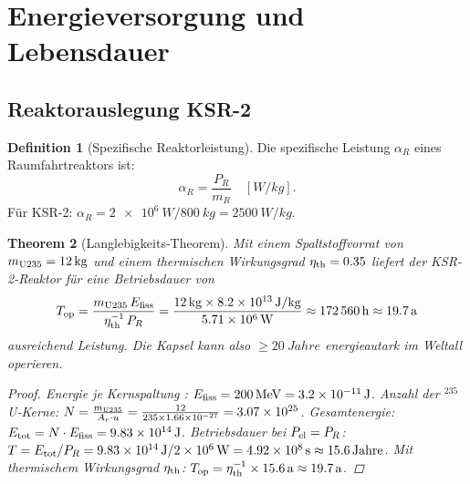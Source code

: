 ﻿\documentclass[a4paper,12pt,twoside]{article}
\theoremstyle{plain}
\newtheorem{theorem}{Theorem}[section]
\theoremstyle{definition}
\newtheorem{definition}[theorem]{Definition}
\theoremstyle{remark}
\begin{document}
	\section{Energieversorgung und Lebensdauer}
	\label{sec:power}
	
	\subsection{Reaktorauslegung KSR-2}
	
	\begin{definition}[Spezifische Reaktorleistung]
		Die spezifische Leistung $\alpha_R$ eines Raumfahrtreaktors ist:
		\begin{equation}
			\alpha_R = \frac{P_R}{m_R} \quad [\si{W/kg}].
		\end{equation}
		Für KSR-2: $\alpha_R = \SI{2e6}{W} / \SI{800}{kg} = \SI{2500}{W/kg}$.
	\end{definition}
	
	\begin{theorem}[Langlebigkeits-Theorem]
		\label{thm:longevity}
		Mit einem Spaltstoffvorrat von $m_{\rm U235} = \SI{12}{kg}$ und einem
		thermischen Wirkungsgrad $\eta_{\rm th} = 0.35$ \cite{angelo1985, dewar2004} liefert der KSR-2-Reaktor
		für eine Betriebsdauer von
		\begin{equation}
			T_{\rm op} = \frac{m_{\rm U235}\,E_{\rm fiss}}{\eta_{\rm th}^{-1}\,P_R}
			= \frac{\SI{12}{kg}\times\SI{8.2e13}{J/kg}}{\SI{5.71e6}{W}}
			\approx \SI{172560}{h} \approx \SI{19.7}{a}
		\end{equation}
		ausreichend Leistung. Die Kapsel kann also $\geq \SI{20}{Jahre}$
		energieautark im Weltall operieren.
		\begin{proof}
			Energie je Kernspaltung \cite{lamarsh2001}: $E_{\rm fiss} = \SI{200}{MeV} = \SI{3.2e-11}{J}$.
			Anzahl der $^{235}$U-Kerne: $N = \frac{m_{\rm U235}}{A_r \cdot u}
			= \frac{12}{235\times\SI{1.66e-27}{}} = \SI{3.07e25}{}$.
			Gesamtenergie: $E_{\rm tot} = N\cdot E_{\rm fiss} = \SI{9.83e14}{J}$.
			Betriebsdauer bei $P_{\rm el} = P_R$: $T = E_{\rm tot}/P_R
			= \SI{9.83e14}{J} / \SI{2e6}{W} = \SI{4.92e8}{s} \approx 15.6\,\text{Jahre}$.
			Mit thermischem Wirkungsgrad $\eta_{\rm th}$: 
			$T_{\rm op} = \eta_{\rm th}^{-1}\times15.6\,\text{a} \approx \SI{19.7}{a}$.
			\qedhere
		\end{proof}
	\end{theorem}
	
\end{document}
